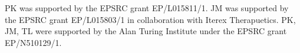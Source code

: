 \documentclass{article}
\theoremstyle{plain}
\theoremstyle{definition}
\begin{document}
	
	\begin{ack}
	PK was supported by the EPSRC grant EP/L015811/1. JM was supported by the EPSRC grant EP/L015803/1 in collaboration with Iterex Therapuetics. PK, JM, TL were supported by the Alan Turing Institute under the EPSRC grant EP/N510129/1.
	\end{ack}
	
	\small
	
	 
	
	\normalsize
	\newpage
	\appendix
\end{document}
